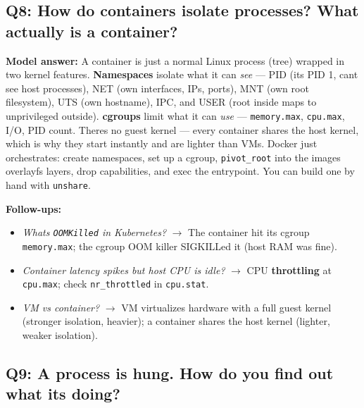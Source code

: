 \documentclass[11pt]{article}
\providecommand{\tightlist}{\setlength{\itemsep}{1pt}\setlength{\parskip}{0pt}}
\begin{document}
\subsection{Q8: How do containers isolate processes? What actually is a container?}\label{q8-how-do-containers-isolate-processes-what-actually-is-a-container}

\textbf{Model answer:} A container is just a normal Linux process (tree) wrapped in two kernel features. \textbf{Namespaces} isolate what it can \emph{see} --- PID (it\textquotesingle s PID 1, can\textquotesingle t see host processes), NET (own interfaces, IPs, ports), MNT (own root filesystem), UTS (own hostname), IPC, and USER (root inside maps to unprivileged outside). \textbf{cgroups} limit what it can \emph{use} --- \texttt{memory.max}, \texttt{cpu.max}, I/O, PID count. There\textquotesingle s no guest kernel --- every container shares the host kernel, which is why they start instantly and are lighter than VMs. Docker just orchestrates: create namespaces, set up a cgroup, \texttt{pivot\_root} into the image\textquotesingle s overlayfs layers, drop capabilities, and exec the entrypoint. You can build one by hand with \texttt{unshare}.

\textbf{Follow-ups:}

\begin{itemize}
\tightlist
\item
  \emph{What\textquotesingle s \texttt{OOMKilled} in Kubernetes?} \(\rightarrow\) The container hit its cgroup \texttt{memory.max}; the cgroup OOM killer SIGKILLed it (host RAM was fine).
\item
  \emph{Container latency spikes but host CPU is idle?} \(\rightarrow\) CPU \textbf{throttling} at \texttt{cpu.max}; check \texttt{nr\_throttled} in \texttt{cpu.stat}.
\item
  \emph{VM vs container?} \(\rightarrow\) VM virtualizes hardware with a full guest kernel (stronger isolation, heavier); a container shares the host kernel (lighter, weaker isolation).
\end{itemize}

\subsection{Q9: A process is hung. How do you find out what it\textquotesingle s doing?}\label{q9-a-process-is-hung-how-do-you-find-out-what-its-doing}
\end{document}
